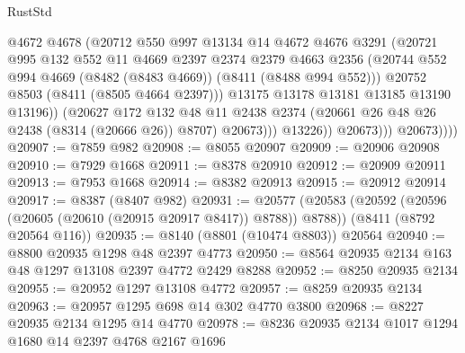 \begin{lexlean}{RustStd}
\begin{coremodule}
                            @4672
                            @4678
                            (@20712
                              @550
                              @997
                              @13134
                              @14
                              @4672
                              @4676
                              @3291
                              (@20721
                                @995
                                @132
                                @552
                                @11
                                @4669
                                @2397
                                @2374
                                @2379
                                @4663
                                @2356
                                (@20744
                                  @552
                                  @994
                                  @4669
                                  (@8482 (@8483 @4669))
                                  (@8411 (@8488 @994 @552)))
                                @20752
                                @8503
                                (@8411 (@8505 @4664 @2397)))
                              @13175
                              @13178
                              @13181
                              @13185
                              @13190
                              @13196))
                          (@20627
                            @172
                            @132
                            @48
                            @11
                            @2438
                            @2374
                            (@20661 @26 @48 @26 @2438 (@8314 (@20666 @26)) @8707)
                            @20673)))
                      @13226))
                  @20673)))
            @20673))))
@20907 := @7859 @982
@20908 := @8055 @20907
@20909 := @20906 @20908
@20910 := @7929 @1668
@20911 := @8378 @20910
@20912 := @20909 @20911
@20913 := @7953 @1668
@20914 := @8382 @20913
@20915 := @20912 @20914
@20917 := @8387 (@8407 @982)
@20931 := @20577
    (@20583 (@20592 (@20596 (@20605 (@20610 (@20915 @20917 @8417)) @8788)) @8788))
    (@8411 (@8792 @20564 @116))
@20935 := @8140 (@8801 (@10474 @8803)) @20564
@20940 := @8800 @20935 @1298 @48 @2397 @4773
@20950 := @8564 @20935 @2134 @163 @48 @1297 @13108 @2397 @4772 @2429 @8288
@20952 := @8250 @20935 @2134
@20955 := @20952 @1297 @13108 @4772
@20957 := @8259 @20935 @2134
@20963 := @20957 @1295 @698 @14 @302 @4770 @3800
@20968 := @8227 @20935 @2134 @1295 @14 @4770
@20978 := @8236 @20935 @2134 @1017 @1294 @1680 @14 @2397 @4768 @2167 @1696

\end{coremodule}
\end{lexlean}
